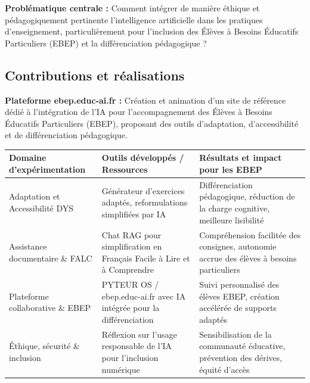 \textbf{Problématique centrale :} Comment intégrer de manière éthique et pédagogiquement pertinente l'intelligence artificielle dans les pratiques d'enseignement, particulièrement pour l'inclusion des Élèves à Besoins Éducatifs Particuliers (EBEP) et la différenciation pédagogique ?

\subsection{Contributions et réalisations}

\textbf{Plateforme ebep.educ-ai.fr :} Création et animation d'un site de référence dédié à l'intégration de l'IA pour l'accompagnement des Élèves à Besoins Éducatifs Particuliers (EBEP), proposant des outils d'adaptation, d'accessibilité et de différenciation pédagogique.

\begin{center}
\footnotesize
\begin{tabular}{|p{4cm}|p{5cm}|p{7cm}|}
\hline
\textbf{Domaine d'expérimentation} & \textbf{Outils développés / Ressources} & \textbf{Résultats et impact pour les EBEP} \\
\hline
Adaptation et Accessibilité DYS & Générateur d'exercices adaptés, reformulations simplifiées par IA & Différenciation pédagogique, réduction de la charge cognitive, meilleure lisibilité \\
\hline
Assistance documentaire \& FALC & Chat RAG pour simplification en Français Facile à Lire et à Comprendre & Compréhension facilitée des consignes, autonomie accrue des élèves à besoins particuliers \\
\hline
Plateforme collaborative \& EBEP & PYTEUR OS / ebep.educ-ai.fr avec IA intégrée pour la différenciation & Suivi personnalisé des élèves EBEP, création accélérée de supports adaptés \\
\hline
Éthique, sécurité \& inclusion & Réflexion sur l'usage responsable de l'IA pour l'inclusion numérique & Sensibilisation de la communauté éducative, prévention des dérives, équité d'accès \\
\hline
\end{tabular}
\end{center}
